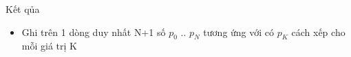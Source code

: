 Kết qủa
\begin{itemize}
	\item Ghi trên 1 dòng duy nhất N+1 số $p_{0}$ .. $p_{N}$ tương ứng với có $p_{K}$ cách xếp cho mỗi giá trị K
\end{itemize}